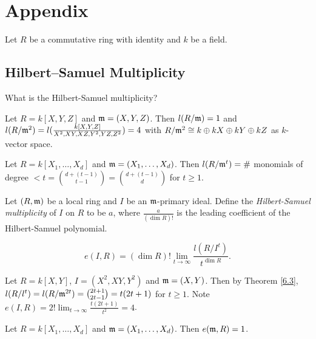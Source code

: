 \chapter{Appendix}

Let $R$ be a commutative ring with identity and $k$ be a field. 

\section*{Hilbert–Samuel Multiplicity}

\begin{question}\label{6.1}
    What is the Hilbert-Samuel multiplicity? 
\end{question}

\begin{example}\label{6.2}
    Let $R = k[X,Y,Z]$ and $\mathfrak{m} = (X,Y,Z)$. Then $l(R/\mathfrak{m}) = 1$ and $l(R/\mathfrak{m}^{2}) = l(\frac{k[X,Y,Z]}{X^{2},XY,XZ,Y^{2},YZ,Z^{2}}) = 4$ with $R/\mathfrak{m}^{2} \cong k \oplus kX \oplus kY \oplus kZ$ as $k$-vector space.
\end{example}

\begin{theorem}\label{6.3}
    Let $R = k[X_1,\ldots,X_d]$ and $\mathfrak{m} = (X_1,\ldots,X_d)$. Then $l(R/\mathfrak{m}^{t}) = \#$ monomials of degree  $< t = \binom {d + (t-1)}{t-1} = \binom {d+(t-1)}{d}$ for $t \geq 1$.
\end{theorem}

\begin{definition}\label{6.4}
    Let $(R,\mathfrak{m})$ be a local ring and $I$ be an $\mathfrak{m}$-primary ideal. Define the \emph{Hilbert-Samuel multiplicity} of $I$ on $R$ to be $a$, where $\frac{a}{(\dim R)!}$ is the leading coefficient of the Hilbert-Samuel polynomial.
\end{definition}

\begin{definition}\label{6.5}
    \[e(I,R) = (\dim R)! \lim_{t \to \infty} \frac{l(R/I^{t})}{t^{\dim R}}.\]
\end{definition}

\begin{example}\label{6.6}
    Let $R = k[X,Y]$, $I = (X^{2},XY,Y^{2})$ and $\mathfrak{m} = (X,Y)$. Then by Theorem \ref{6.3}, $l(R/l^{t}) = l(R/\mathfrak{m}^{2t}) = \binom {2t+1}{2t-1} = t(2t+1)$ for $t \geq 1$. Note $e(I,R) = 2! \lim_{t \to \infty} \frac{t(2t+1)}{t^{2}} = 4$.
\end{example}

\begin{fact}\label{6.7}
    Let $R = k[X_1,\ldots,X_d]$ and $\mathfrak{m} = (X_1,\ldots,X_d)$. Then $e(\mathfrak{m},R) = 1$.
\end{fact}

